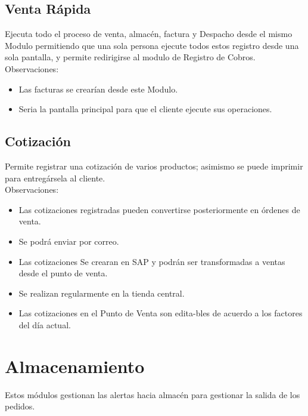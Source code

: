 \documentclass[pdftex,12pt,oneside,a4paper,spanish, english, brazil]{abntex2}
\begin{document}
\begin{sloppypar}
              \subsection{Venta Rápida}
              Ejecuta todo el proceso de venta, almacén, factura y Despacho desde el mismo Modulo permitiendo que una sola persona ejecute todos estos registro desde una sola pantalla, y permite redirigirse al modulo de Registro de Cobros.\\
              Observaciones:
              \begin{itemize}
              	\item Las facturas se crearían desde este Modulo.
              	\item Seria la pantalla principal para que el cliente ejecute sus operaciones.
              \end{itemize}
              \subsection{Cotización}
              Permite registrar una cotización de varios productos; asimismo se puede imprimir para entregársela al cliente.\\
              Observaciones:
              
              \begin{itemize}
                \item  Las cotizaciones registradas pueden convertirse posteriormente en órdenes de venta. 
                \item Se podrá enviar por correo.
                \item Las cotizaciones Se crearan en SAP y podrán ser transformadas a ventas desde el punto de venta.
                \item Se realizan regularmente en la tienda central.
                \item Las cotizaciones en el Punto de Venta son edita-bles de acuerdo a los factores del día actual.
              \end{itemize}
            \section{Almacenamiento}
            Estos módulos gestionan las alertas hacia almacén para gestionar la salida de los pedidos.

\end{sloppypar}
\end{document}
